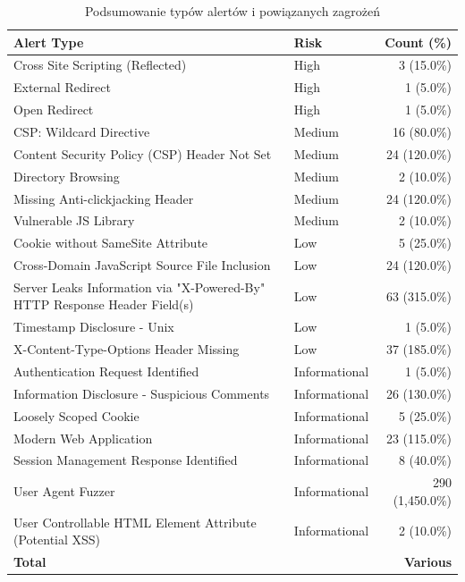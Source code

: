   \begin{table}[htbp]
    \centering
    \scriptsize
    \caption{Podsumowanie typów alertów i powiązanych zagrożeń}
    \label{tab:alert_summary}
    \begin{tabular}{|l|l|r|}
    \hline
    \textbf{Alert Type} & \textbf{Risk} & \textbf{Count (\%)} \\
    \hline
    Cross Site Scripting (Reflected) & High & 3 (15.0\%) \\
    External Redirect & High & 1 (5.0\%) \\
    Open Redirect & High & 1 (5.0\%) \\
    CSP: Wildcard Directive & Medium & 16 (80.0\%) \\
    Content Security Policy (CSP) Header Not Set & Medium & 24 (120.0\%) \\
    Directory Browsing & Medium & 2 (10.0\%) \\
    Missing Anti-clickjacking Header & Medium & 24 (120.0\%) \\
    Vulnerable JS Library & Medium & 2 (10.0\%) \\
    Cookie without SameSite Attribute & Low & 5 (25.0\%) \\
    Cross-Domain JavaScript Source File Inclusion & Low & 24 (120.0\%) \\
    Server Leaks Information via "X-Powered-By" HTTP Response Header Field(s) & Low & 63 (315.0\%) \\
    Timestamp Disclosure - Unix & Low & 1 (5.0\%) \\
    X-Content-Type-Options Header Missing & Low & 37 (185.0\%) \\
    Authentication Request Identified & Informational & 1 (5.0\%) \\
    Information Disclosure - Suspicious Comments & Informational & 26 (130.0\%) \\
    Loosely Scoped Cookie & Informational & 5 (25.0\%) \\
    Modern Web Application & Informational & 23 (115.0\%) \\
    Session Management Response Identified & Informational & 8 (40.0\%) \\
    User Agent Fuzzer & Informational & 290 (1,450.0\%) \\
    User Controllable HTML Element Attribute (Potential XSS) & Informational & 2 (10.0\%) \\
    \hline
    \textbf{Total} & & \textbf{Various} \\
    \hline
    \end{tabular}
    \end{table}
    

